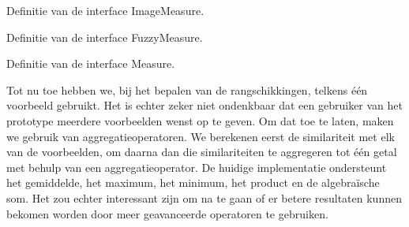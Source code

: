 \begin{code}[!b]
\vspace{5pt}
\begin{lgrind}

\end{lgrind}
\vspace{5pt}
\caption{\label{code:imagemeasure}Definitie van de interface {\klassefont ImageMeasure}.}
\end{code}
%
\begin{code}[!b]
\vspace{5pt}
\begin{lgrind}

\end{lgrind}
\vspace{5pt}
\caption{\label{code:fuzzymeasure}Definitie van de interface {\klassefont FuzzyMeasure}.}
\end{code}
%
\begin{code}[!b]
\vspace{5pt}
\begin{lgrind}

\end{lgrind}
\vspace{5pt}
\caption{\label{code:measure}Definitie van de interface {\klassefont Measure}.}
\end{code}

Tot nu toe hebben we, bij het bepalen van de rangschikkingen, telkens \'e\'en 
voorbeeld gebruikt. Het is echter zeker niet ondenkbaar dat een gebruiker
van het prototype meerdere voorbeelden wenst op te geven. Om dat toe te laten,
maken we gebruik van aggregatieoperatoren. We berekenen eerst de similariteit met
elk van de voorbeelden, om daarna dan die similariteiten te aggregeren tot \'e\'en
getal met behulp van een aggregatieoperator. De huidige implementatie 
ondersteunt het gemiddelde, het maximum, het minimum, het product en de 
algebra\"ische som. Het zou echter interessant zijn om na te gaan of er betere
resultaten kunnen bekomen worden door meer geavanceerde operatoren te gebruiken.

